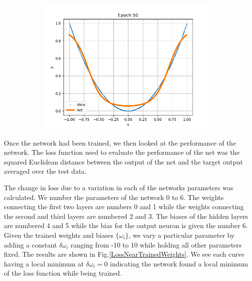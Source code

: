 \documentclass[12pt,a4paper]{article}
\begin{document}
\begin{figure}
\begin{subfigure}{.32\textwidth}
\caption{}
\label{training2}
\end{subfigure}
\begin{subfigure}{.32\textwidth}
\includegraphics[scale=0.3]{Images/ALearningNet50.png}
\caption{}
\label{training3}
\end{subfigure}
\caption{}
\label{training}
\end{figure}

Once the network had been trained, we then looked at the performance of the network. The loss function used to evaluate the performance of the net was the squared Euclidean distance between the output of the net and the target output averaged over the test data.

The change in loss due to a variation in each of the networks parameters was calculated. We number the parameters of the network 0 to 6. The weights connecting the first two layers are numbers 0 and 1 while the weights connecting the second and third layers are numbered 2 and 3. The biases of the hidden layers are numbered 4 and 5 while the bias for the output neuron is given the number 6. Given the trained weights and biases $\{\omega_i\}$, we vary a particular parameter by adding a constant $\delta \omega_i$ ranging from -10 to 10 while holding all other parameters fixed. The results are shown in Fig.\ref{LossNearTrainedWeights}. We see each curve having a local minimum at $\delta\omega_i = 0$ indicating the network found a local minimum of the loss function while being trained.
\end{document}
